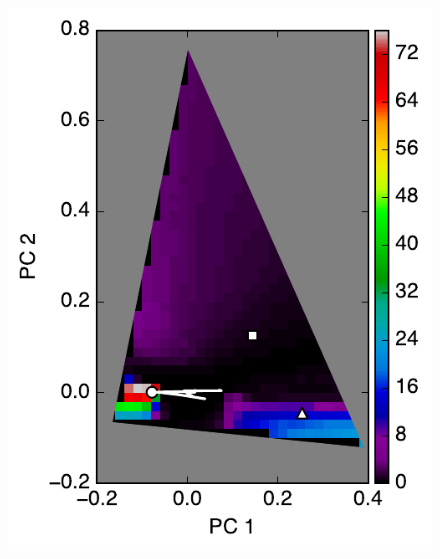 \documentclass[iop,numberedappendix,apj,]{emulateapj}
\begin{document}
\begin{figure}[tbh!]
\begin{minipage}{0.33\hsize}
\begin{center}
\includegraphics[width=\hsize]{mockdata_90deg_3types_t12_lc_reg_l30deg.pdf}
    \end{center}
     \end{minipage}      
   \begin{minipage}{0.33\hsize}
    \begin{center}

\end{center}
\end{minipage}
\end{figure}
\end{document}
